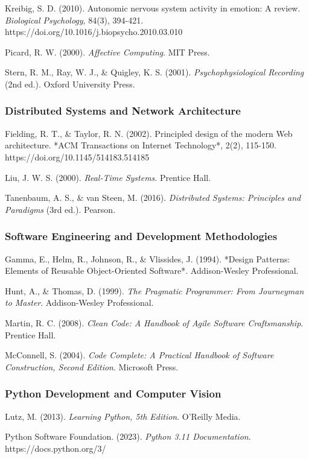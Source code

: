 \documentclass[11pt,a4paper]{article}
\begin{document}
Kreibig, S. D. (2010). Autonomic nervous system activity in emotion: A review. \textit{Biological Psychology}, 84(3),
394-421. https://doi.org/10.1016/j.biopsycho.2010.03.010

Picard, R. W. (2000). \textit{Affective Computing}. MIT Press.

Stern, R. M., Ray, W. J., \& Quigley, K. S. (2001). \textit{Psychophysiological Recording} (2nd ed.). Oxford University Press.

\subsubsection{Distributed Systems and Network Architecture}

Fielding, R. T., \& Taylor, R. N. (2002). Principled design of the modern Web architecture. *ACM Transactions on Internet
Technology*, 2(2), 115-150. https://doi.org/10.1145/514183.514185

Liu, J. W. S. (2000). \textit{Real-Time Systems}. Prentice Hall.

Tanenbaum, A. S., \& van Steen, M. (2016). \textit{Distributed Systems: Principles and Paradigms} (3rd ed.). Pearson.

\subsubsection{Software Engineering and Development Methodologies}

Gamma, E., Helm, R., Johnson, R., \& Vlissides, J. (1994). *Design Patterns: Elements of Reusable Object-Oriented
Software*. Addison-Wesley Professional.

Hunt, A., \& Thomas, D. (1999). \textit{The Pragmatic Programmer: From Journeyman to Master}. Addison-Wesley Professional.

Martin, R. C. (2008). \textit{Clean Code: A Handbook of Agile Software Craftsmanship}. Prentice Hall.

McConnell, S. (2004). \textit{Code Complete: A Practical Handbook of Software Construction, Second Edition}. Microsoft Press.

\subsubsection{Python Development and Computer Vision}

Lutz, M. (2013). \textit{Learning Python, 5th Edition}. O'Reilly Media.

Python Software Foundation. (2023). \textit{Python 3.11 Documentation}. https://docs.python.org/3/
\end{document}
